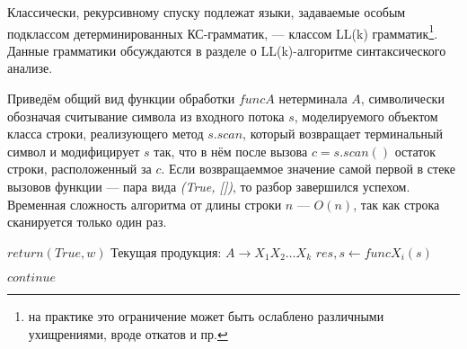 \documentclass[10pt]{article}         %
\begin{document}
	Классически, рекурсивному спуску подлежат языки, задаваемые особым подклассом детерминированных КС-грамматик, --- классом LL(k) грамматик\footnote{на практике это ограничение может быть ослаблено различными ухищрениями, вроде откатов и пр.}. Данные грамматики обсуждаются в разделе о LL(k)-алгоритме синтаксического анализе. 
	
	Приведём общий вид функции обработки $funcA$ нетерминала $A$, символически обозначая считывание символа из входного потока $s$, моделируемого объектом класса строки, реализующего метод $s.scan$, который возвращает терминальный символ и модифицирует $s$ так, что в нём после вызова $c=s.scan()$ остаток строки, расположенный за $c$. Если возвращаеммое значение самой первой в стеке вызовов функции  --- пара вида \textit{(True, [])}, то разбор завершился успехом. Временная сложность алгоритма от длины строки $n$ --- $O(n)$, так как строка сканируется только один раз.
	
	\begin{algorithm}[tbh]\label{alg:RD}
		\caption{$funcA(s: str)\rightarrow{(status: bool, substr: str)}$}\label{alg:rd1}
		\begin{algorithmic}
			\State $return (True,w)$
			\EndIf
			\State Текущая продукция: $A \to {X_1X_2\dots{X_k}}$
			\State $res, s \gets funcX_i(s)$
			\EndIf
			
			\Else
			\State $continue$
			\EndIf
			\Else
			\EndIf
			\EndFor
			
			
			
		\end{algorithmic}
	\end{algorithm}
	
\end{document}

